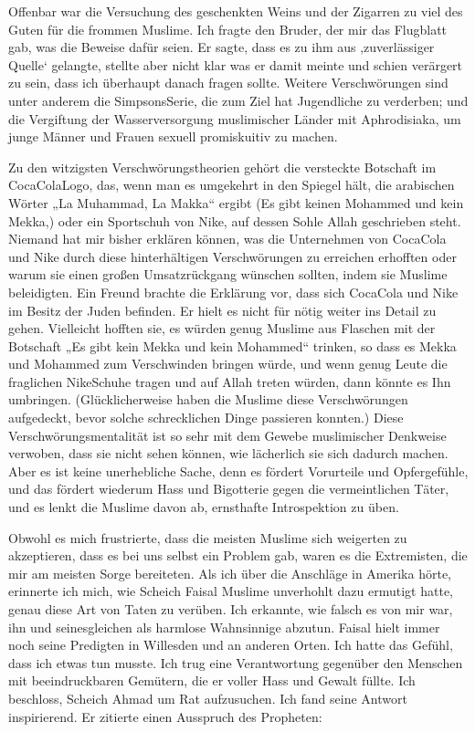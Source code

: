 \documentclass[12pt]{memoir}
\begin{document}
Offenbar war die Versuchung des geschenkten Weins und der Zigarren
zu viel des Guten für die frommen Muslime.
Ich fragte den Bruder, der mir das Flugblatt gab, was die Beweise dafür seien.
Er sagte, dass es zu ihm aus ‚zuverlässiger Quelle‘ gelangte,
stellte aber nicht klar was er damit meinte
und schien verärgert zu sein, dass ich überhaupt danach fragen sollte.
Weitere Verschwörungen sind unter anderem die Simpsons\–Serie,
die zum Ziel hat Jugendliche zu verderben;
und die Vergiftung der Wasserversorgung
muslimischer Länder mit Aphrodisiaka,
um junge Männer und Frauen sexuell promiskuitiv zu machen.

Zu den witzigsten Verschwörungstheorien
gehört die versteckte Botschaft im Coca\–Cola\–Logo,
das, wenn man es umgekehrt in den Spiegel hält,
die arabischen Wörter „La Muhammad, La Makka“ ergibt
(Es gibt keinen Mohammed und kein Mekka,)
oder ein Sportschuh von Nike, auf dessen Sohle Allah geschrieben steht.
Niemand hat mir bisher erklären können,
was die Unternehmen von Coca\–Cola und Nike
durch diese hinterhältigen Verschwörungen zu erreichen erhofften
oder warum sie einen großen Umsatzrückgang wünschen sollten,
indem sie Muslime beleidigten.
Ein Freund brachte die Erklärung vor, dass sich Coca\–Cola und Nike
im Besitz der Juden befinden.
Er hielt es nicht für nötig weiter ins Detail zu gehen.
Vielleicht hofften sie,
es würden genug Muslime aus Flaschen mit der Botschaft
„Es gibt kein Mekka und kein Mohammed“ trinken,
so dass es Mekka und Mohammed zum Verschwinden bringen würde,
und wenn genug Leute die fraglichen Nike\–Schuhe tragen
und auf Allah treten würden, dann könnte es Ihn umbringen.
(Glücklicherweise haben die Muslime diese Verschwörungen aufgedeckt,
bevor solche schrecklichen Dinge passieren konnten.)
Diese Verschwörungsmentalität ist so sehr
mit dem Gewebe muslimischer Denkweise verwoben,
dass sie nicht sehen können, wie lächerlich sie sich dadurch machen.
Aber es ist keine unerhebliche Sache,
denn es fördert Vorurteile und Opfergefühle,
und das fördert wiederum Hass und Bigotterie
gegen die vermeintlichen Täter,
und es lenkt die Muslime davon ab,
ernsthafte Introspektion zu üben.

Obwohl es mich frustrierte,
dass die meisten Muslime sich weigerten zu akzeptieren,
dass es bei uns selbst ein Problem gab,
waren es die Extremisten, die mir am meisten Sorge bereiteten.
Als ich über die Anschläge in Amerika hörte, erinnerte ich mich,
wie Scheich Faisal Muslime unverhohlt dazu ermutigt hatte,
genau diese Art von Taten zu verüben.
Ich erkannte, wie falsch es von mir war,
ihn und seinesgleichen als harmlose Wahnsinnige abzutun.
Faisal hielt immer noch seine Predigten in Willesden und an anderen Orten.
Ich hatte das Gefühl, dass ich etwas tun musste.
Ich trug eine Verantwortung gegenüber den Menschen
mit beeindruckbaren Gemütern, die er voller Hass und Gewalt füllte.
Ich beschloss, Scheich Ahmad um Rat aufzusuchen.
Ich fand seine Antwort inspirierend.
Er zitierte einen Ausspruch des Propheten:
\end{document}
